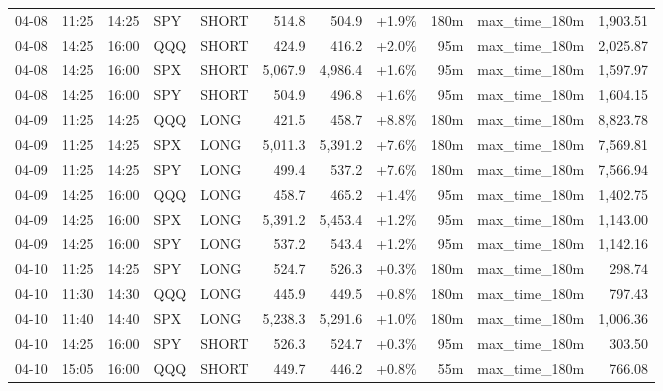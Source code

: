 \documentclass[11pt,a4paper,twoside]{article}
\begin{document}
\begin{center}
\begin{longtable}{>{\color{txtmain}}l l l l l r r r r >{\color{txtmain}}l r}
04-08 & 11:25 & 14:25 & SPY & SHORT & 514.8 & 504.9 & \textcolor{wingreen}{+1.9\%} & 180m & max\_time\_180m & \textcolor{wingreen}{1,903.51} \\
04-08 & 14:25 & 16:00 & QQQ & SHORT & 424.9 & 416.2 & \textcolor{wingreen}{+2.0\%} & 95m & max\_time\_180m & \textcolor{wingreen}{2,025.87} \\
04-08 & 14:25 & 16:00 & SPX & SHORT & 5,067.9 & 4,986.4 & \textcolor{wingreen}{+1.6\%} & 95m & max\_time\_180m & \textcolor{wingreen}{1,597.97} \\
04-08 & 14:25 & 16:00 & SPY & SHORT & 504.9 & 496.8 & \textcolor{wingreen}{+1.6\%} & 95m & max\_time\_180m & \textcolor{wingreen}{1,604.15} \\
04-09 & 11:25 & 14:25 & QQQ & LONG & 421.5 & 458.7 & \textcolor{wingreen}{+8.8\%} & 180m & max\_time\_180m & \textcolor{wingreen}{8,823.78} \\
04-09 & 11:25 & 14:25 & SPX & LONG & 5,011.3 & 5,391.2 & \textcolor{wingreen}{+7.6\%} & 180m & max\_time\_180m & \textcolor{wingreen}{7,569.81} \\
04-09 & 11:25 & 14:25 & SPY & LONG & 499.4 & 537.2 & \textcolor{wingreen}{+7.6\%} & 180m & max\_time\_180m & \textcolor{wingreen}{7,566.94} \\
04-09 & 14:25 & 16:00 & QQQ & LONG & 458.7 & 465.2 & \textcolor{wingreen}{+1.4\%} & 95m & max\_time\_180m & \textcolor{wingreen}{1,402.75} \\
04-09 & 14:25 & 16:00 & SPX & LONG & 5,391.2 & 5,453.4 & \textcolor{wingreen}{+1.2\%} & 95m & max\_time\_180m & \textcolor{wingreen}{1,143.00} \\
04-09 & 14:25 & 16:00 & SPY & LONG & 537.2 & 543.4 & \textcolor{wingreen}{+1.2\%} & 95m & max\_time\_180m & \textcolor{wingreen}{1,142.16} \\
04-10 & 11:25 & 14:25 & SPY & LONG & 524.7 & 526.3 & \textcolor{wingreen}{+0.3\%} & 180m & max\_time\_180m & \textcolor{wingreen}{298.74} \\
04-10 & 11:30 & 14:30 & QQQ & LONG & 445.9 & 449.5 & \textcolor{wingreen}{+0.8\%} & 180m & max\_time\_180m & \textcolor{wingreen}{797.43} \\
04-10 & 11:40 & 14:40 & SPX & LONG & 5,238.3 & 5,291.6 & \textcolor{wingreen}{+1.0\%} & 180m & max\_time\_180m & \textcolor{wingreen}{1,006.36} \\
04-10 & 14:25 & 16:00 & SPY & SHORT & 526.3 & 524.7 & \textcolor{wingreen}{+0.3\%} & 95m & max\_time\_180m & \textcolor{wingreen}{303.50} \\
04-10 & 15:05 & 16:00 & QQQ & SHORT & 449.7 & 446.2 & \textcolor{wingreen}{+0.8\%} & 55m & max\_time\_180m & \textcolor{wingreen}{766.08} \\

\end{longtable}
\end{center}
\end{document}
